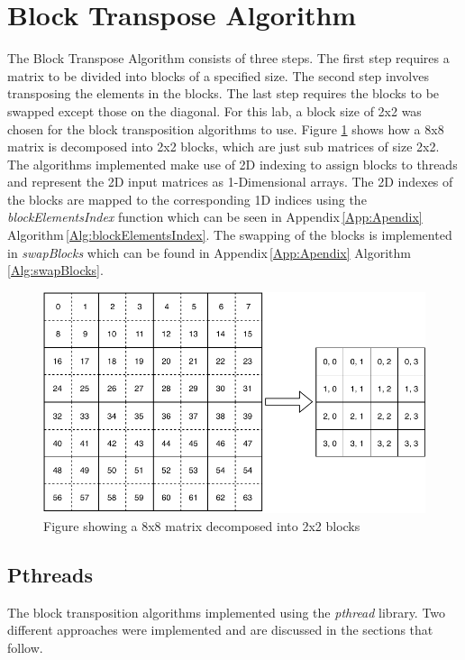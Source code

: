 \documentclass[10pt, onecolumn]{article}
\begin{document}
\section{Block Transpose Algorithm}
%
The Block Transpose Algorithm consists of three steps. The first step requires a matrix to be divided into blocks of a specified size. The second step involves transposing the elements in the blocks. The last step requires the blocks to be swapped except those on the diagonal. For this lab, a block size of 2x2 was chosen for the block transposition algorithms to use. Figure \ref{fig:BlockDecomposition} shows how a 8x8 matrix is decomposed into 2x2 blocks, which are just sub matrices of size 2x2. The algorithms implemented make use of 2D indexing to assign blocks to threads and represent the 2D input matrices as 1-Dimensional arrays. The 2D indexes of the blocks are mapped to the corresponding 1D indices using the \emph{blockElementsIndex} function which can be seen in Appendix\,\ref{App:Apendix} Algorithm\,\ref{Alg:blockElementsIndex}. The swapping of the blocks is implemented in \emph{swapBlocks} which can be found in Appendix\,\ref{App:Apendix} Algorithm\,\ref{Alg:swapBlocks}.
%
\begin{figure}[H]
    \centering
    \includegraphics[scale=0.7]{Documentation/BlockDecomposition.pdf}
    \caption{Figure showing a 8x8 matrix decomposed into 2x2 blocks}
    \label{fig:BlockDecomposition}
\end{figure}
%
\subsection{Pthreads}
%
The block transposition algorithms implemented using the \emph{pthread} library. Two different approaches were implemented and are discussed in the sections that follow.
%
\end{document}
